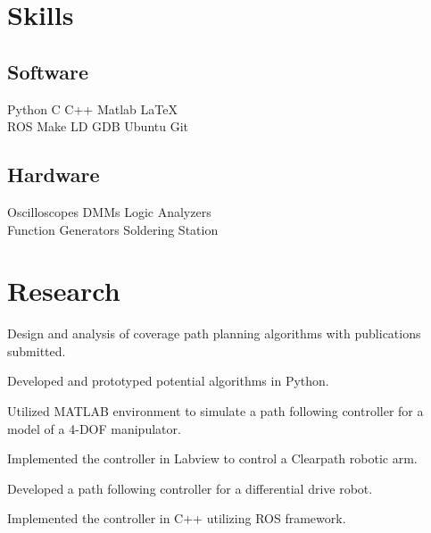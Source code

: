 \documentclass[]{deedy-resume-openfont}
\begin{document}
\section{Skills}
\begin{minipage}[t]{.6\textwidth}
\subsection{Software}
Python \textbullet{} C \textbullet{} C++ \textbullet{} Matlab \textbullet{}
\LaTeX\ \\ 
ROS \textbullet{} Make \textbullet{} LD \textbullet{} GDB \textbullet{} Ubuntu \textbullet{} Git
\sectionsep
\end{minipage}
\hfill
\begin{minipage}[t]{.35\textwidth}
\subsection{Hardware}
Oscilloscopes \textbullet{} DMMs \textbullet{} Logic Analyzers\\
Function Generators \textbullet{} Soldering Station\\ 
\end{minipage}


\section{Research}
\begin{tightemize}
\item Design and analysis of coverage path planning algorithms with publications submitted.
\item Developed and prototyped potential algorithms in Python.
\end{tightemize}
\sectionsep

\begin{tightemize}
\item Utilized MATLAB environment to simulate a path following controller for a model of a 4-DOF manipulator.
\item Implemented the controller in Labview to control a Clearpath robotic arm.
\item Developed a path following controller for a differential drive robot.
\item Implemented the controller in C++ utilizing ROS framework.
\end{tightemize}
\sectionsep
\end{document}
